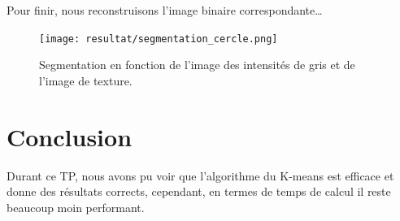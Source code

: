 \documentclass[a4paper,11pt]{article}
\begin{document}
  Pour finir, nous reconstruisons l'image binaire correspondante\ldots
  
  \begin{figure}[H]
    \center
    \texttt{[image: resultat/segmentation\_cercle.png]}
    \caption{Segmentation en fonction de l'image des intensités de gris et de l'image de texture.}
  \end{figure}
  
  \section{Conclusion}
  Durant ce TP, nous avons pu voir que l'algorithme du K-means est efficace et donne des résultats 
  corrects, cependant, en termes de temps de calcul il reste beaucoup moin performant.
  
\end{document}
